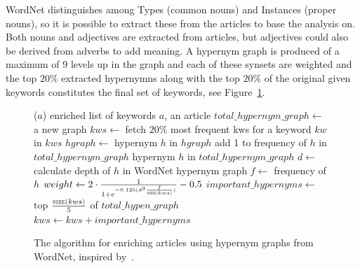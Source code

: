 WordNet distinguishes among Types (common nouns) and Instances (proper nouns), so it is possible to extract these from the articles to base the analysis on. Both nouns and adjectives are extracted from articles, but adjectives could also be derived from adverbs to add meaning. A hypernym graph is produced of a maximum of 9 levels up in the graph and each of these synsets are weighted and the top $20\%$ extracted hypernymns along with the top $20\%$ of the original given keywords constitutes the final set of keywords, see Figure~\ref{fig:wordnet_enrich}.
\begin{figure}[ht!p]
	\hspace{-40pt}
	\newsavebox{\wordnetenrichbox}
	\begin{lrbox}{\wordnetenrichbox}
	\begin{minipage}{.75\largefigure}
		\vspace{-5pt}
		\begin{codebox}
\zi {}($a$)  enriched list of keywords
    \Indentmore
\zi {}
    \Indentmore
    \zi $a$, an article \End
\zi $total\_hypernym\_graph \leftarrow$ a new graph
\zi $kws \leftarrow$ fetch $20\%$ most frequent kws for a
    \zi \For {} keyword $kw$ in $kws$  \Do
    \zi 	$hgraph \leftarrow$ 
    \zi 	\For {} hypernym $h$ in $hgraph$  \Do
    \zi			add 1 to frequency of $h$ in $total\_hypernym\_graph$ \End \End
    \zi \For {} hypernym $h$ in $total\_hypernym\_graph$  \Do
    \zi     $d \leftarrow$ calculate depth of $h$ in WordNet hypernym graph
    \zi     $f \leftarrow$ frequency of $h$
    \zi     $weight \leftarrow 2 \cdot \frac{1}{1+e^{-0.125(d^3\frac{f}{\textnormal{\scshape size($kws$)}})}}-0.5$ \End
    \zi {}
    \zi $important\_hypernyms \leftarrow$ top $\frac{\textnormal{\scshape size($kws$)}}{5}$ of $total\_hypen\_graph$
    \zi \Return $kws \leftarrow kws + important\_hypernyms$
    \End
		\end{codebox}
		\vspace{-5pt}
	\end{minipage}
	\end{lrbox}\fbox{\usebox{\wordnetenrichbox}}
			\caption{The  algorithm for enriching articles using hypernym graphs from WordNet, inspired by~\protect\cite{116262780379.pdf}.}
			\label{fig:wordnet_enrich}
\end{figure}

